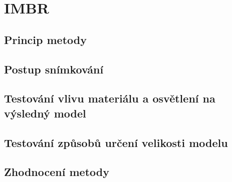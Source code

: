 \chapter{IMBR}
\label{3-technologie}


\section{Princip metody}


\section{Postup snímkování}

\section{Testování vlivu materiálu a osvětlení na výsledný model}

\section{Testování způsobů určení velikosti modelu}

\section{Zhodnocení metody}


